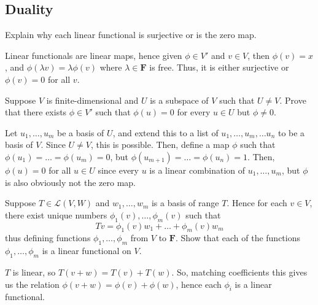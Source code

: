 \documentclass[10pt]{article}
\begin{document}
	\subsection{Duality}
	\begin{problem}
		Explain why each linear functional is surjective or is the zero map.  
	\end{problem}

	\begin{solution}
		Linear functionals are linear maps, hence given \( \phi \in V' \) and \( v \in V \), then \( \phi(v)
		= x \), and \( \phi(\lambda v) = \lambda \phi(v) \) where \( \lambda \in \mathbf{F} \) is free. Thus,
		it is either surjective or \( \phi(v) = 0 \) for all \( v \).  
	\end{solution}

	\begin{problem}
		Suppose \( V \) is finite-dimensional and \( U \) is a subspace of \( V \) such that \( U \neq V \).
		Prove that there exists \( \phi \in V' \) such that \( \phi(u) = 0 \) for every \( u \in U \) but \(
		\phi \neq 0 \). 
	\end{problem}

	\begin{solution}
		Let \( u_1, \dots, u_m \) be a basis of \( U \), and extend this to a list of \( u_1, \dots, u_m,
		\dots u_n \) to be a basis of \( V \). Since \( U \neq V \), this is possible. Then, define a map \(
		\phi\) such that \( \phi(u_1) = \dots = \phi(u_m) = 0 \), but \( \phi(u_{m + 1}) = \dots = \phi(u_n)
		= 1\). Then, \( \phi(u) = 0 \) for all \( u \in U \) since every \( u \) is a linear combination of
		\( u_1, \dots, u_m \), but \( \phi \) is also obviously not the zero map.     
	\end{solution}

	\begin{problem}
		Suppose \( T \in \mathcal{L}(V, W) \) and \( w_1, \dots, w_m \) is a basis of range \( T \). Hence
		for each \( v \in V \), there exist unique numbers \( \phi_1(v), \dots, \phi_m(v) \) such that
		\[
			Tv = \phi_1(v)w_1 + \dots + \phi_m(v) w_m
		\]
		thus defining functions \( \phi_1, \dots, \phi_m \) from \( V \) to \( \mathbf{F} \). Show that each
		of the functions \( \phi_1, \dots, \phi_m \) is a linear functional on \( V \). 
	\end{problem}

	\begin{solution}
		\( T \) is linear, so \( T(v + w) = T(v) + T(w) \). So, matching coefficients this gives us the
		relation \( \phi(v + w) = \phi(v) + \phi(w) \), hence each \( \phi_i \) is a linear functional.  
	\end{solution}
\end{document}
